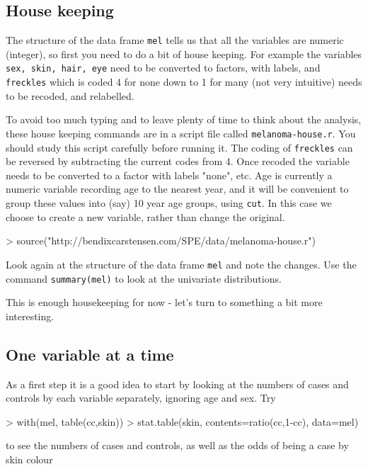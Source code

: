 \subsection{House keeping}
The structure of the data frame {\tt mel} tells us that all the variables are numeric (integer), so first you need to do a bit of house keeping. For example the variables {\tt sex, skin, hair, eye} need to be converted to factors, with labels, and {\tt freckles} which is coded 4 for none down to 1 for many (not very intuitive) needs to be recoded, and relabelled.

To avoid too much typing and to leave plenty of time to think about the analysis, these house keeping commands are in a script file called {\tt melanoma-house.r}. You should study this script carefully before running it.
The coding of {\tt freckles} can be reversed by subtracting the current codes from 4. Once recoded the variable needs to be converted to a factor with labels "none", etc. Age is currently a numeric variable recording age to the nearest year, and it will be convenient to group these values into (say) 10 year age groups, using {\tt cut}. In this case we choose to create a new variable, rather than change the original.

\begin{Schunk}
\begin{Sinput}
> source("http://bendixcarstensen.com/SPE/data/melanoma-house.r")
\end{Sinput}
\end{Schunk}

Look again at the structure of the data frame {\tt mel} and note the changes. Use the command {\tt summary(mel)} to look at the univariate distributions.


This is enough housekeeping for now - let's turn to something a bit more interesting.

\subsection{One variable at a time}
As a first step it is a good idea to start by looking at the numbers of cases and controls by each variable separately, ignoring age and sex. Try
\begin{Schunk}
\begin{Sinput}
> with(mel, table(cc,skin))
> stat.table(skin, contents=ratio(cc,1-cc), data=mel)
\end{Sinput}
\end{Schunk}
to see the numbers of cases and controls, as well as the 
odds of being a case by skin colour


